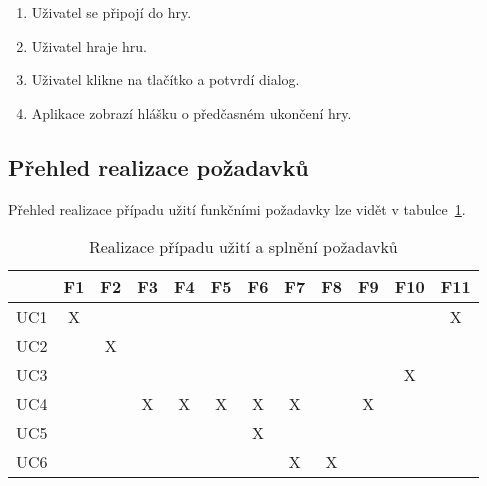 \begin{enumerate}
    \item Uživatel se připojí do hry.
    \item Uživatel hraje hru.
    \item Uživatel klikne na tlačítko 
    a potvrdí dialog.
    \item Aplikace zobrazí hlášku o předčasném ukončení hry.
\end{enumerate}

\let\thesubsection=\oldsubsection

\subsection{Přehled realizace požadavků}

Přehled realizace případu užití funkčními požadavky lze vidět v
tabulce~\ref{tab:use-case-requirements}.

\begin{table}[h!]
    \centering
    \begin{tabular}{c||c|c|c|c|c|c|c|c|c|c|c} 
        & F1 & F2 & F3 & F4 & F5 & F6 & F7 & F8 & F9 & F10 & F11 \\\hline\hline
        UC1 & X &   &   &   &   &   &   &   &   &   & X \\\hline %
        UC2 &   & X &   &   &   &   &   &   &   &   &   \\\hline %
        UC3 &   &   &   &   &   &   &   &   &   & X &   \\\hline %
        UC4 &   &   & X & X & X & X & X &   & X &   &   \\\hline %
        UC5 &   &   &   &   &   & X &   &   &   &   &   \\\hline %
        UC6 &   &   &   &   &   &   & X & X &   &   &   \\ %
    \end{tabular}
    \caption{Realizace případu užití a splnění požadavků}
    \label{tab:use-case-requirements}
\end{table}
